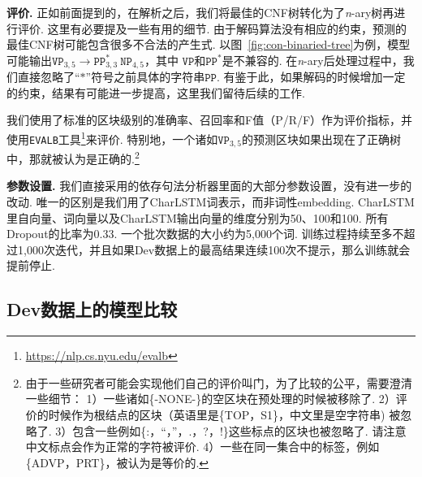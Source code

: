 \noindent\textbf{评价.}
正如前面提到的，在解析之后，我们将最佳的CNF树转化为了\textit{n}-ary树再进行评价.
这里有必要提及一些有用的细节.
由于解码算法没有相应的约束，预测的最佳CNF树可能包含很多不合法的产生式.
以图~\ref{fig:con-binaried-tree}为例，模型可能输出$\texttt{VP}_{3,5} \rightarrow \texttt{PP}^{\ast}_{3,3} ~ \texttt{NP}_{4,5}$，其中 $\texttt{VP}$和$\texttt{PP}^{\ast}$是不兼容的.
在\textit{n}-ary后处理过程中，我们直接忽略了``$\mathtt{\ast}$''符号之前具体的字符串$\texttt{PP}$.
有鉴于此，如果解码的时候增加一定的约束，结果有可能进一步提高，这里我们留待后续的工作.

我们使用了标准的区块级别的准确率、召回率和F值（P/R/F）作为评价指标，并使用\texttt{EVALB}工具\footnote{\url{https://nlp.cs.nyu.edu/evalb}}来评价.
特别地，一个诸如$\texttt{VP}_{3,5}$的预测区块如果出现在了正确树中，那就被认为是正确的.\footnote{
    由于一些研究者可能会实现他们自己的评价叫门，为了比较的公平，需要澄清一些细节：
    1）一些诸如\{-NONE-\}的空区块在预处理的时候被移除了.
    2）评价的时候作为根结点的区块（英语里是\{TOP，S1\}，中文里是空字符串) 被忽略了.
    3）包含一些例如\{:，``，''，.，?，!\}这些标点的区块也被忽略了. 请注意中文标点会作为正常的字符被评价.
    4）一些在同一集合中的标签，例如\{ADVP，PRT\}，被认为是等价的.}

\noindent\textbf{参数设置.}
我们直接采用\cite{Timothy-d17-biaffine}的依存句法分析器里面的大部分参数设置，没有进一步的改动.
唯一的区别是我们用了CharLSTM词表示，而非词性embedding.
CharLSTM里自向量、词向量以及CharLSTM输出向量的维度分别为50、100和100.
所有Dropout的比率为0.33.
一个批次数据的大小约为5,000个词.
训练过程持续至多不超过1,000次迭代，并且如果Dev数据上的最高结果连续100次不提示，那么训练就会提前停止.



\subsection{Dev数据上的模型比较}

